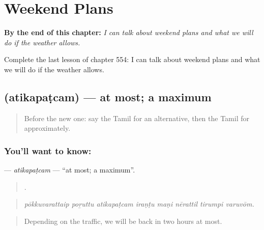 
\chapter{Weekend Plans}
\label{ch:ta-weekend-plans}

\begin{chapteropening}
\textbf{By the end of this chapter:} \emph{I can talk about weekend plans and what we will do if the weather allows.}

Complete the last lesson of chapter 554: I can talk about weekend plans and what we will do if the weather allows.
\end{chapteropening}

\section[\texorpdfstring{\ta{அதிகபட்சம்} (atikapaṭcam)}{அதிகபட்சம் (atikapaṭcam)}]{ (atikapaṭcam) — at most; a maximum}

\label{lesson:TA-C554-atikapatcam}



\begin{quote}
Before the new one: say the Tamil for an alternative, then the Tamil for approximately.
\end{quote}

\subsection*{You'll want to know: }
\textbf{} — \emph{atikapaṭcam} — \textquotedblleft{}at most; a maximum\textquotedblright{}.

\begin{quote}
       .
\end{quote}

\begin{quote}
\emph{pōkkuvarattaip poṟuttu atikapaṭcam iraṇṭu maṇi nērattil tirumpi varuvōm.}
\end{quote}

\begin{quote}
Depending on the traffic, we will be back in two hours at most.
\end{quote}

